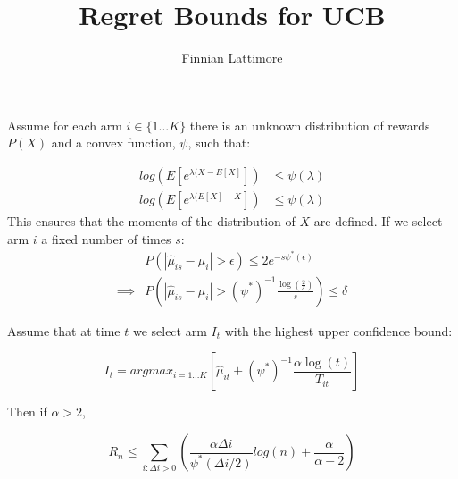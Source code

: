 \documentclass{article}
\title{Regret Bounds for UCB}
\author{Finnian Lattimore}
\newcommand{\eqn}[1]{\begin{align}#1\end{align}}
\theoremstyle{plain}
\theoremstyle{definition}
\begin{document}
\def\ci{\perp\!\!\!\perp}
\maketitle


Assume for each arm $i \in \{1...K\} $ there is an unknown distribution of rewards $P(X)$ and a convex function, $\psi$, such that:

\begin{equation}
\begin{aligned}
log(E[e^{\lambda(X-E[X]}]) & \leq \psi(\lambda)\\
log(E[e^{\lambda(E[X]-X}]) & \leq \psi(\lambda)
\end{aligned}
\end{equation}
This ensures that the moments of the distribution of $X$ are defined. If we select arm $i$ a fixed number of times $s$:
\eqn {
\label{eq:hoeff1}
& P(|\hat \mu_{is} - \mu_{i}| > \epsilon) \leq 2e^{-s\psi^*(\epsilon)} \\
\label{eq:hoeff2}
 \implies & P(|\hat \mu_{is} - \mu_{i}| > (\psi^{*})^{-1}\frac{\log(\frac{2}{\delta})}{s}) \leq \delta
}



Assume that at time $t$ we select arm $I_t$ with the highest upper confidence bound:

\begin{equation}
\label{eq:armSelection}
I_{t} = argmax_{i=1...K}\left[\hat{\mu}_{it} + (\psi^{*})^{-1}\frac{\alpha \log(t)}{T_{it}}\right]
\end{equation}

Then if $\alpha > 2$,

\begin{equation}
R_n \leq \sum_{i:\Delta i > 0}\left(\frac{\alpha \Delta i}{\psi^{*}(\Delta i/2)}log(n)+\frac{\alpha}{\alpha-2}\right)
\end{equation}
\end{document}
